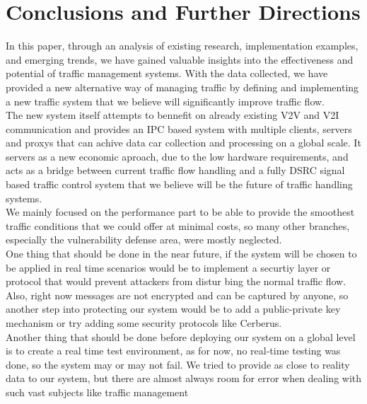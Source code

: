 \documentclass[17pt]{report}
\begin{document}
\chapter{Conclusions and Further Directions}
\indent \indent
In this paper, through an analysis of existing research,
implementation examples, and emerging trends, we have gained valuable
insights into the effectiveness and potential of traffic management
systems. With the data collected, we have provided a new alternative 
way of managing traffic by defining and implementing a new traffic 
system that we believe will significantly improve traffic flow. \\
\indent
The new system itself attempts to bennefit on already existing V2V and V2I
communication and provides an IPC based system with multiple clients, servers
and proxys that can achive data car collection and processing on a global scale.
It servers as a new economic aproach, due to the low hardware requirements,
and acts as a bridge between current traffic flow handling and a fully 
DSRC signal based traffic control system that we believe will be the 
future of traffic handling systems. \\
\indent 
We mainly focused on the performance part to be able to provide
the smoothest traffic conditions that we could offer at minimal costs,
so many other branches, especially the vulnerability defense area,
were mostly neglected. \\
\indent
One thing that should be done in the near future, if the system will be chosen to be 
applied in real time scenarios would be to implement a securtiy 
layer or protocol that would prevent attackers from distur
bing the 
normal traffic flow. Also, right now messages are not encrypted and 
can be captured by anyone, so another step into protecting our system 
would be to add a public-private key mechanism or try adding some 
security protocols like Cerberus. \\
\indent 
Another thing that should be done before deploying our system on a 
global level is to create a real time test environment, as for now,
no real-time testing was done, so the system may or may not fail. 
We tried to provide as close to reality data to our system, but there 
are almost always room for error when dealing with such vast subjects
like traffic management

\pagebreak
\printbibliography
\end{document}

